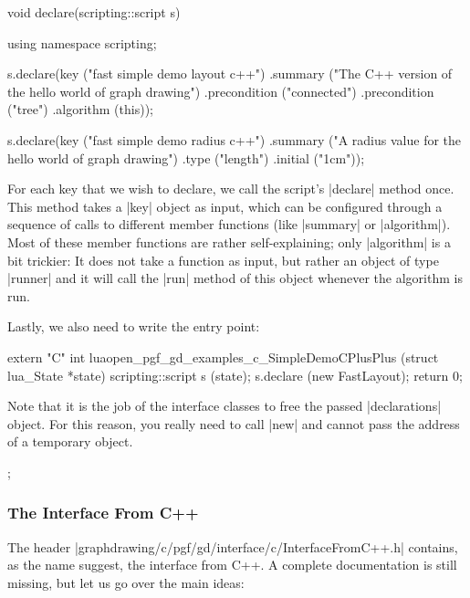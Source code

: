 \begin{codeexample}
void declare(scripting::script s) {
  using namespace scripting;

  s.declare(key ("fast simple demo layout c++")
            .summary ("The C++ version of the hello world of graph drawing")
            .precondition ("connected")
            .precondition ("tree")
            .algorithm (this));
    
  s.declare(key ("fast simple demo radius c++")
            .summary ("A radius value for the hello world of graph drawing")
            .type ("length")
            .initial ("1cm"));
}
\end{codeexample}

For each key that we wish to declare, we call the script's |declare|
method once. This method takes a |key| object as input, which can be
configured through a sequence of calls to different member functions
(like |summary| or |algorithm|). Most of these member functions are
rather self-explaining; only |algorithm| is a bit trickier: It does
not take a function as input, but rather an object of type |runner|
and it will call the |run| method of this object whenever the
algorithm is run.

Lastly, we also need to write the entry point:

\begin{codeexample}
extern "C" int luaopen_pgf_gd_examples_c_SimpleDemoCPlusPlus (struct lua_State *state) {
  scripting::script s (state);
  s.declare (new FastLayout);
  return 0;
}
\end{codeexample}

Note that it is the job of the interface classes to free the passed
|declarations| object. For this reason, you really need to call |new|
and cannot pass the address of a temporary object.


\begin{codeexample}[]
\tikz {};
\end{codeexample}

\subsubsection{The Interface From C++}

The header |graphdrawing/c/pgf/gd/interface/c/InterfaceFromC++.h|
contains, as the name suggest, the interface from C++. A complete
documentation is still missing, but let us go over the main ideas:

